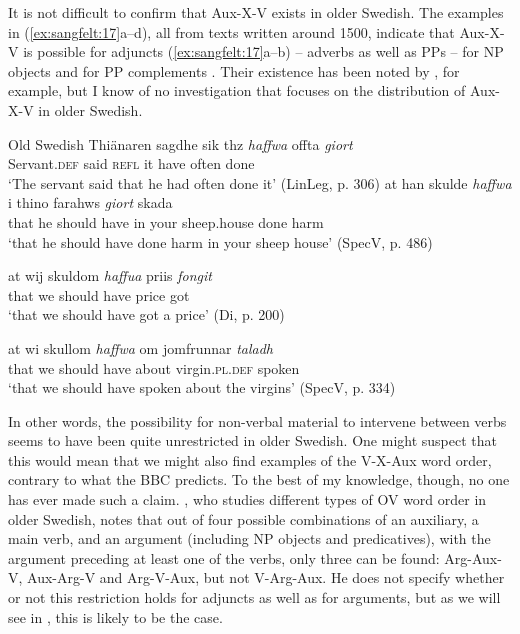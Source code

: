 \documentclass[output=paper, colorlinks, citecolor=brown]{langscibook}
\begin{document}
It is not difficult to confirm that Aux-X-V exists in older Swedish. The examples in (\ref{ex:sangfelt:17}a–d), all from texts written around 1500, indicate that Aux-X-V is possible for adjuncts (\ref{ex:sangfelt:17}a–b) – adverbs as well as PPs – for NP objects  and for PP complements . Their existence has been noted by \citet[171--172]{Falk1993}, for example, but I know of no investigation that focuses on the distribution of Aux-X-V in older Swedish.


\ea Old Swedish\label{ex:sangfelt:17}
\ea\label{ex:sangfelt:17a}
\gll Thiänaren sagdhe sik thz \textit{haffwa} {offta} \textit{giort} \\
 Servant.\textsc{def} said \textsc{refl} it have often done\\
\glt ‘The servant said that he had often done it’ (LinLeg, p. 306)
\ex\label{ex:sangfelt:17b}
\gll at han skulde \textit{haffwa} i {thino} {farahws} \textit{giort} skada \\
 that he should have in your sheep.house done harm\\
\glt ‘that he should have done harm in your sheep house’ (SpecV, p. 486)

\ex\label{ex:sangfelt:17c}
\gll at wij skuldom \textit{haffua} {priis} \textit{fongit} \\
 that we should have price got\\
\glt ‘that we should have got a price' (Di, p. 200)

\ex\label{ex:sangfelt:17d}
\gll at wi skullom \textit{haffwa} {om} {jomfrunnar} \textit{taladh} \\
 that we should have about virgin.\textsc{pl.def} spoken\\
\glt ‘that we should have spoken about the virgins’ (SpecV, p. 334)
\z 
\z 

In other words, the possibility for non-verbal material to intervene between verbs seems to have been quite unrestricted in older Swedish. One might suspect that this would mean that we might also find examples of the V-X-Aux word order, contrary to what the BBC predicts. To the best of my knowledge, though, no one has ever made such a claim. \citet[155, 158–160]{Petzell2011}, who studies different types of OV word order in older Swedish, notes that out of four possible combinations of an auxiliary, a main verb, and an argument (including NP objects and predicatives), with the argument preceding at least one of the verbs, only three can be found: Arg-Aux-V, Aux-Arg-V and Arg-V-Aux, but not V-Arg-Aux. He does not specify whether or not this restriction holds for adjuncts as well as for arguments, but as we will see in , this is likely to be the case.
\end{document}
